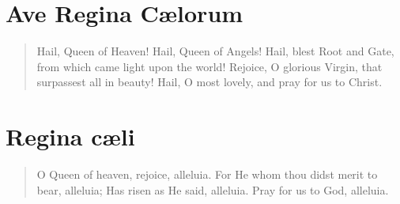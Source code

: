 {{\afterant{}
}
%
\pagebreak


\section{Ave Regina Cælorum}
\printsimpletone{}
\printsolemntone{}
\begin{quote}{Hail, Queen of Heaven! Hail, Queen of Angels! Hail, blest Root and Gate, from which came light upon the world! Rejoice, O glorious Virgin, that surpassest all in beauty! Hail, O most lovely, and pray for us to Christ.}\end{quote}

\bigskip{}
{
\newcommand{\vlatin}{Dignáre me laudáre te Vírgo sacráta.}
\newcommand{\venglish}{Voucshafe, O holy Virgin, that I may praise thee.}
\newcommand{\rlatin}{Da míhi virtútem cóntra hóstes túos.}
\newcommand{\renglish}{Give me power against thine enemies.}
\newcommand{\prayerlatin}{Concéde, miséricors Deus, fragilitáti nostræ præ\-sí\-di\-um :~\gredagger{}~ut qui sanctæ Dei Genitrícis memóriam ágimus, * intercessiónis ejus auxílio a nostris iniquitátibus resurgámus. Per eúmdem Christum Dóminum nostrum. \Rbar~Amen.}
\newcommand{\prayerenglish}{Grant, O merciful God, Thy protection to us in our weakness; that we, who celebrate the memory of the holy Mother of God, may, through the aid of her intercession, rise again from our sins. Through the same Christ our Lord. \Rbar~Amen.}

\afterant{}
}
%



\section{Regina cæli}
\printsimpletone{}
\printsolemntone{}
\begin{quote}{O Queen of heaven, rejoice, alleluia.
For He whom thou didst merit to bear, alleluia;
Has risen as He said, alleluia.
Pray for us to God, alleluia.}\end{quote}

}
